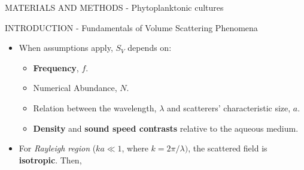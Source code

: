 \documentclass[handout]{beamer}
\newcommand\Fontable{\fontsize{9}{10}\selectfont}
\begin{document}
\begin{frame}{MATERIALS AND METHODS - Phytoplanktonic cultures}


\end{frame}


\begin{frame}{INTRODUCTION - Fundamentals of Volume Scattering Phenomena}
\Fontable
\begin{itemize}
\item<2-> When assumptions apply, $S_V$ depends on:
	\begin{itemize}
	\Fontable
		\item<2-> \textbf{Frequency}, $f$.
		\item<2-> Numerical Abundance, $N$.
		\item<2-> Relation between the wavelength, $\lambda$ and scatterers' characteristic size, $a$.
		\item<2-> \textbf{Density} and \textbf{sound speed contrasts} relative to the aqueous medium.
	\end{itemize}
	
\vspace{2mm}
\item<3-> For \textit{Rayleigh region} ($k  a \ll 1$, where $k=2\pi / \lambda)$, the scattered field is \textbf{isotropic}. Then,
\end{itemize}

\end{frame}
\end{document}
